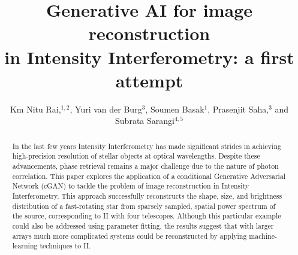 \documentclass[twocolumn]{emulateapj}
\begin{document}
\title{Generative AI for image reconstruction\\ in Intensity Interferometry: a first attempt}

\author{Km Nitu Rai,$^{1,2}$, Yuri van der Burg$^{3}$, Soumen
  Basak$^{1}$, Prasenjit Saha,$^{3}$ and Subrata Sarangi$^{4,5}$}






\begin{abstract}
In the last few years Intensity Interferometry has made significant strides in achieving high-precision resolution of stellar objects at optical wavelengths. Despite these advancements, phase retrieval remains a major challenge due to the nature of photon correlation. This paper explores the application of a conditional Generative Adversarial Network (cGAN) to tackle the problem of image reconstruction in Intensity Interferometry. This approach successfully reconstructs the shape, size, and brightness distribution of a fast-rotating star from sparsely sampled, spatial power spectrum of the source, corresponding to II with four telescopes.  Although this particular example could also be addressed using parameter fitting, the results suggest that with larger arrays much more complicated systems could be reconstructed by applying machine-learning techniques to II.
\end{abstract}

\maketitle










\end{document}
